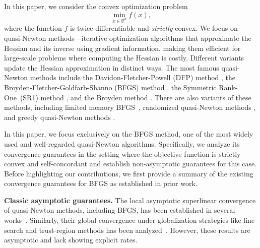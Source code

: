 \documentclass[11pt,letterpaper]{article}
\newcommand\0{{\Vector{0}}}
\newcommand\1{{\Vector{1}}}
\numberwithin{assumption}{section}
\numberwithin{definition}{section}
\numberwithin{theorem}{section}
\numberwithin{remark}{section}
\begin{document}
In this paper, we consider the convex optimization problem
\begin{equation}
    \min_{x \in \mathbb{R}^d} f(x),
\end{equation}
where the function $f$ is twice differentiable and \textit{strictly} convex. We focus on quasi-Newton methods—iterative optimization algorithms that approximate the Hessian and its inverse using gradient information, making them efficient for large-scale problems where computing the Hessian is costly. Different variants update the Hessian approximation in distinct ways.
 The most famous quasi-Newton methods include the Davidon-Fletcher-Powell (DFP) method \cite{davidon1959variable,fletcher1963rapidly}, the Broyden-Fletcher-Goldfarb-Shanno (BFGS) method \cite{broyden1970convergence,fletcher1970new,goldfarb1970family,shanno1970conditioning}, the Symmetric Rank-One~(SR1) method \cite{conn1991convergence,khalfan1993theoretical},  and the Broyden method \cite{broyden1965class}. There are also variants of these methods, including limited memory BFGS~\cite{liu1989limited, nocedal1980updating}, randomized quasi-Newton methods \cite{gower2016stochastic,gower2017randomized,kovalev2020fast,lin2021greedy, lin2022explicit}, and greedy quasi-Newton methods \cite{lin2021greedy,lin2022explicit,rodomanov2020greedy,ji2023greedy}.%

In this paper, we focus exclusively on the BFGS method, one of the most widely used and well-regarded quasi-Newton algorithms. Specifically, we analyze its convergence guarantees in the setting where the objective function is strictly convex and self-concordant and establish non-asymptotic guarantees for this case. Before highlighting our contributions, we first provide a summary of the existing convergence guarantees for BFGS as established in prior work.

\textbf{Classic asymptotic guarantees.} The local asymptotic superlinear convergence of quasi-Newton methods, including BFGS, has been established in several works~\cite{broyden1973local,dennis1974characterization,griewank1982local,dennis1989convergence,yuan1991modified,al1998global,li1999globally,yabe2007local,mokhtari2017iqn,gao2019quasi}. Similarly, their global convergence under globalization strategies like line search and trust-region methods has been analyzed~\cite{khalfan1993theoretical,QN_tool,powell1971convergence, Powell, byrd1987global, byrd1996analysis, SR12024}. However, these results are asymptotic and lack showing explicit rates.
\end{document}
